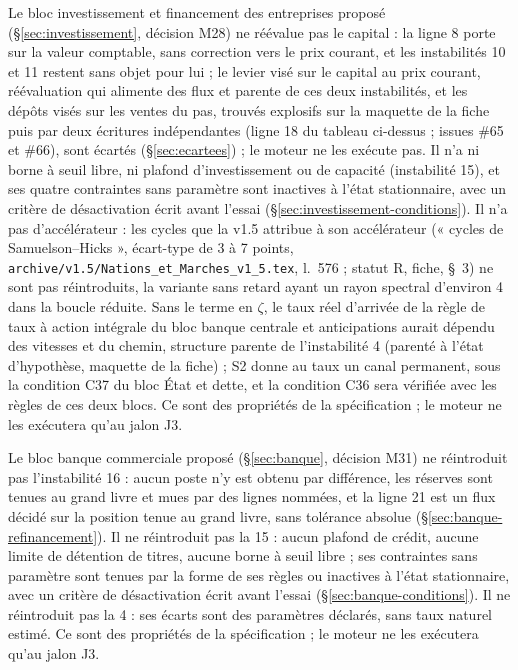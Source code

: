 \documentclass[11pt,a4paper]{article}
\begin{document}
Le bloc investissement et financement des entreprises proposé (\S\ref{sec:investissement}, décision M28) ne réévalue pas le capital : la ligne 8 porte sur la valeur comptable, sans correction vers le prix courant, et les instabilités 10 et 11 restent sans objet pour lui ; le levier visé sur le capital au prix courant, réévaluation qui alimente des flux et parente de ces deux instabilités, et les dépôts visés sur les ventes du pas, trouvés explosifs sur la maquette de la fiche puis par deux écritures indépendantes (ligne 18 du tableau ci-dessus ; issues \#65 et \#66), sont écartés (\S\ref{sec:ecartees}) ; le moteur ne les exécute pas. Il n'a ni borne à seuil libre, ni plafond d'investissement ou de capacité (instabilité 15), et ses quatre contraintes sans paramètre sont inactives à l'état stationnaire, avec un critère de désactivation écrit avant l'essai (\S\ref{sec:investissement-conditions}). Il n'a pas d'accélérateur : les cycles que la v1.5 attribue à son accélérateur (« cycles de Samuelson--Hicks », écart-type de 3 à 7 points, \nolinkurl{archive/v1.5/Nations_et_Marches_v1_5.tex}, l.~576 ; statut R, fiche, \S~3) ne sont pas réintroduits, la variante sans retard ayant un rayon spectral d'environ 4 dans la boucle réduite. Sans le terme en $\zeta$, le taux réel d'arrivée de la règle de taux à action intégrale du bloc banque centrale et anticipations aurait dépendu des vitesses et du chemin, structure parente de l'instabilité 4 (parenté à l'état d'hypothèse, maquette de la fiche) ; S2 donne au taux un canal permanent, sous la condition C37 du bloc État et dette, et la condition C36 sera vérifiée avec les règles de ces deux blocs. Ce sont des propriétés de la spécification ; le moteur ne les exécutera qu'au jalon J3.

Le bloc banque commerciale proposé (\S\ref{sec:banque}, décision M31) ne réintroduit pas l'instabilité 16 : aucun poste n'y est obtenu par différence, les réserves sont tenues au grand livre et mues par des lignes nommées, et la ligne 21 est un flux décidé sur la position tenue au grand livre, sans tolérance absolue (\S\ref{sec:banque-refinancement}). Il ne réintroduit pas la 15 : aucun plafond de crédit, aucune limite de détention de titres, aucune borne à seuil libre ; ses contraintes sans paramètre sont tenues par la forme de ses règles ou inactives à l'état stationnaire, avec un critère de désactivation écrit avant l'essai (\S\ref{sec:banque-conditions}). Il ne réintroduit pas la 4 : ses écarts sont des paramètres déclarés, sans taux naturel estimé. Ce sont des propriétés de la spécification ; le moteur ne les exécutera qu'au jalon J3.
\end{document}
